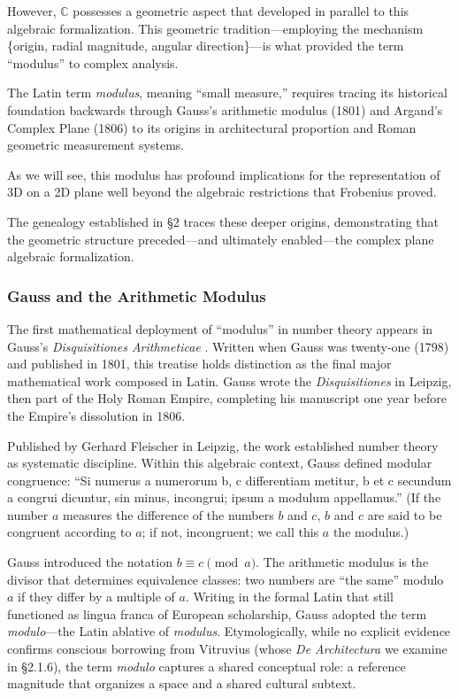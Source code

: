 However, $\mathbb{C}$ possesses a geometric aspect that developed in parallel to this algebraic formalization. This geometric tradition—employing the mechanism \{origin, radial magnitude, angular direction\}—is what provided the term ``modulus'' to complex analysis.

The Latin term \textit{modulus}, meaning ``small measure,'' requires tracing its historical foundation backwards through Gauss's arithmetic modulus (1801) and Argand’s Complex Plane (1806) to its origins in architectural proportion and Roman geometric measurement systems.

As we will see, this modulus has profound implications for the representation of 3D on a 2D plane well beyond the algebraic restrictions that Frobenius proved.

The genealogy established in \S 2 traces these deeper origins, demonstrating that the geometric structure preceded—and ultimately enabled—the complex plane algebraic formalization.

\subsubsection{Gauss and the Arithmetic Modulus}

The first mathematical deployment of ``modulus'' in number theory appears in Gauss's \textit{Disquisitiones Arithmeticae} \cite{Gauss1801}. Written when Gauss was twenty-one (1798) and published in 1801, this treatise holds distinction as the final major mathematical work composed in Latin. Gauss wrote the \textit{Disquisitiones} in Leipzig, then part of the Holy Roman Empire, completing his manuscript one year before the Empire's dissolution in 1806.

Published by Gerhard Fleischer in Leipzig, the work established number theory as systematic discipline. Within this algebraic context, Gauss defined modular congruence: ``Si numerus a numerorum b, c differentiam metitur, b et c secundum a congrui dicuntur, sin minus, incongrui; ipsum a modulum appellamus.'' (If the number $a$ measures the difference of the numbers $b$ and $c$, $b$ and $c$ are said to be congruent according to $a$; if not, incongruent; we call this $a$ the modulus.)

Gauss introduced the notation $b \equiv c \pmod{a}$. The arithmetic modulus is the divisor that determines equivalence classes: two numbers are ``the same'' modulo $a$ if they differ by a multiple of $a$. Writing in the formal Latin that still functioned as lingua franca of European scholarship, Gauss adopted the term \textit{modulo}—the Latin ablative of \textit{modulus}. Etymologically, while no explicit evidence confirms conscious borrowing from Vitruvius (whose \textit{De Architectura} we examine in \S 2.1.6), the term \textit{modulo} captures a shared conceptual role: a reference magnitude that organizes a space and a shared cultural subtext.

